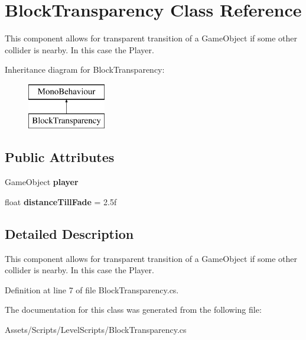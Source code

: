 \hypertarget{class_block_transparency}{\section{Block\+Transparency Class Reference}
\label{class_block_transparency}
}


This component allows for transparent transition of a Game\+Object if some other collider is nearby. In this case the Player.  


Inheritance diagram for Block\+Transparency\+:\begin{figure}[H]
\begin{center}
\leavevmode
\includegraphics[height=2.000000cm]{class_block_transparency}
\end{center}
\end{figure}
\subsection*{Public Attributes}
\begin{DoxyCompactItemize}
\item 
\hypertarget{class_block_transparency_a7c5f9720e40e90ec89cd73ef14ee6623}{Game\+Object {\bfseries player}}\label{class_block_transparency_a7c5f9720e40e90ec89cd73ef14ee6623}

\item 
\hypertarget{class_block_transparency_a3911a87b05cf6726d9b75c5d528ae958}{float {\bfseries distance\+Till\+Fade} = 2.\+5f}\label{class_block_transparency_a3911a87b05cf6726d9b75c5d528ae958}

\end{DoxyCompactItemize}


\subsection{Detailed Description}
This component allows for transparent transition of a Game\+Object if some other collider is nearby. In this case the Player. 



Definition at line 7 of file Block\+Transparency.\+cs.



The documentation for this class was generated from the following file\+:\begin{DoxyCompactItemize}
\item 
Assets/\+Scripts/\+Level\+Scripts/Block\+Transparency.\+cs\end{DoxyCompactItemize}
